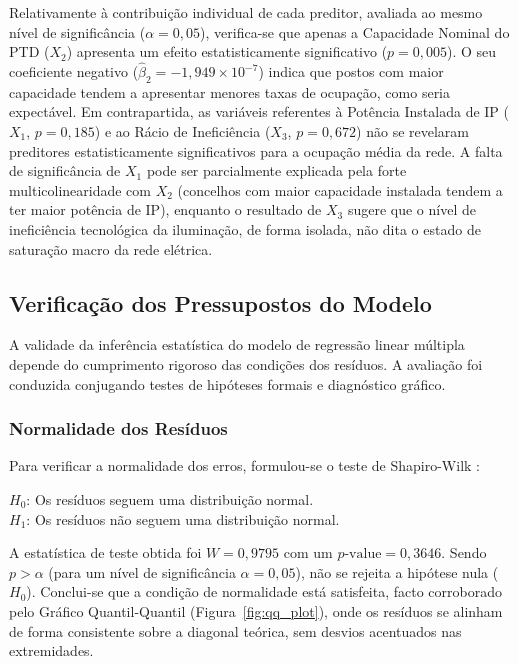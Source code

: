 \documentclass[conference]{IEEEtran}
\begin{document}
Relativamente à contribuição individual de cada preditor, avaliada ao mesmo nível de significância ($\alpha = 0{,}05$), verifica-se que apenas a Capacidade Nominal do PTD ($X_2$) apresenta um efeito estatisticamente significativo ($p = 0{,}005$). O seu coeficiente negativo ($\hat{\beta}_2 = -1{,}949 \times 10^{-7}$) indica que postos com maior capacidade tendem a apresentar menores taxas de ocupação, como seria expectável. Em contrapartida, as variáveis referentes à Potência Instalada de IP ($X_1$, $p = 0{,}185$) e ao Rácio de Ineficiência ($X_3$, $p = 0{,}672$) não se revelaram preditores estatisticamente significativos para a ocupação média da rede. A falta de significância de $X_1$ pode ser parcialmente explicada pela forte multicolinearidade com $X_2$ (concelhos com maior capacidade instalada tendem a ter maior potência de IP), enquanto o resultado de $X_3$ sugere que o nível de ineficiência tecnológica da iluminação, de forma isolada, não dita o estado de saturação macro da rede elétrica.

\subsection{Verificação dos Pressupostos do Modelo}

A validade da inferência estatística do modelo de regressão linear múltipla depende do cumprimento rigoroso das condições dos resíduos. A avaliação foi conduzida conjugando testes de hipóteses formais e diagnóstico gráfico.

\subsubsection{Normalidade dos Resíduos}
Para verificar a normalidade dos erros, formulou-se o teste de Shapiro-Wilk \cite{b8}:
\begin{center}
    $H_0$: Os resíduos seguem uma distribuição normal. \\
    $H_1$: Os resíduos não seguem uma distribuição normal.
\end{center}
A estatística de teste obtida foi $W = 0{,}9795$ com um $p\text{-value} = 0{,}3646$. Sendo $p > \alpha$ (para um nível de significância $\alpha = 0{,}05$), não se rejeita a hipótese nula ($H_0$). Conclui-se que a condição de normalidade está satisfeita, facto corroborado pelo Gráfico Quantil-Quantil (Figura~\ref{fig:qq_plot}), onde os resíduos se alinham de forma consistente sobre a diagonal teórica, sem desvios acentuados nas extremidades.
\end{document}
